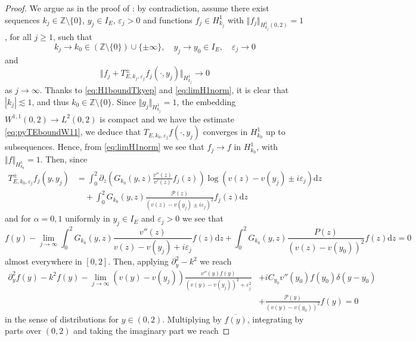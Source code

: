 \documentclass[11pt,reqno]{amsproc}
\theoremstyle{definition}
\numberwithin{equation}{section}
\newcommand{\Z}{{\mathbb Z}}
\renewcommand{\d}{\mathrm{d}}
\newcommand{\ep}{\varepsilon}
\renewcommand{\P}{{\mathcal{P}}}
\begin{document}
\begin{proof}
We argue as in the proof of \cite[Lemma 3.2]{JiaGev20}: by contradiction, assume there exist sequences $k_j\in \mathbb{Z} \setminus \lbrace 0 \rbrace$, $y_j\in I_E$, $\ep_j>0$ and functions $f_j\in H_{k_j}^1$ with $\Vert f_j \Vert_{H_{k_j}^1(0,2)}=1$, for all $j\geq 1$, such that 
\begin{equation*}
k_j \rightarrow k_0\in (\mathbb{Z}\setminus \lbrace 0 \rbrace) \cup \lbrace \pm \infty \rbrace, \quad y_j \rightarrow y_0\in I_E, \quad \ep_j\rightarrow 0
\end{equation*}
and
\begin{equation}\label{eq:limH1norm}
\Vert f_j + T_{E,k_j,\ep_j}^\pm f_j(\cdot,y_j)\Vert_{H_{k_j}^1} \rightarrow 0
\end{equation}
as $j\rightarrow \infty$. Thanks to \eqref{eq:H1boundTkyep} and \eqref{eq:limH1norm}, it is clear that $|k_j|\lesssim 1$, and thus $k_0\in \Z\setminus \lbrace 0 \rbrace$. Since $\Vert g_j \Vert_{H_{k_j}^1}=1$, the embedding $W^{1,1}(0,2)\rightarrow L^2(0,2)$ is compact and we have the estimate \eqref{eq:pyTEboundW11}, we deduce that $T_{E,k_0,\ep_j}f(\cdot,y_j)$ converges in $H^1_{k_0}$ up to subsequences. Hence, from  \eqref{eq:limH1norm} we see that $f_j\rightarrow f$ in $H^1_{k_0}$, with $\Vert f \Vert_{H^1_{k_0}} = 1$. Then, since 
\begin{align*}
T_{E,k_0,\ep_j}^\pm f_j(y,y_j) &= \int_0^2 \partial_z \left( G_{k_0}(y,z)\frac{v''(z)}{v'(z)}f_j(z) \right) \log(v(z) - v(y_j) \pm i\ep_j) \d z \\
&\quad + \int_0^2 G_{k_0}(y,z)\frac{\P(z)}{(v(z) - v(y_j) \pm i\ep_j)^2}f_j(z) \d z
\end{align*}
and  for $\alpha=0,1$ uniformly in $y_j\in I_E$ and $\ep_j>0$ we see that 
\begin{equation*}
f(y) - \lim_{j\rightarrow \infty}  \int_0^2 G_{k_0}(y,z) \frac{v''(z)}{v(z) - v(y_j) + i\ep_j}f(z) \d z +\int_0^2 G_{k_0}(y,z)\frac{P(z)}{(v(z) - v(y_0) )^2}  f(z) \d z = 0
\end{equation*}
almost everywhere in $[0,2]$. Then, applying $\partial_y^2 - k^2$ we reach
\begin{align*}
\partial_y^2 f(y) - k^2 f(y) - \lim_{j\rightarrow \infty} (v(y) - v(y_j))\frac{v''(y) f(y)}{(v(y) - v(y_j))^2 + \ep_j^2} &+i C_{y_0} v''(y_0) f(y_0) \delta(y-y_0) \\
&+ \frac{\P(y)}{(v(y) - v(y_0))^2}f(y) = 0
\end{align*}
in the sense of distributions for $y\in (0,2)$. Multiplying by $\overline{f(y)}$, integrating by parts over $(0,2)$ and taking the imaginary part we reach 

\end{proof}
\end{document}
